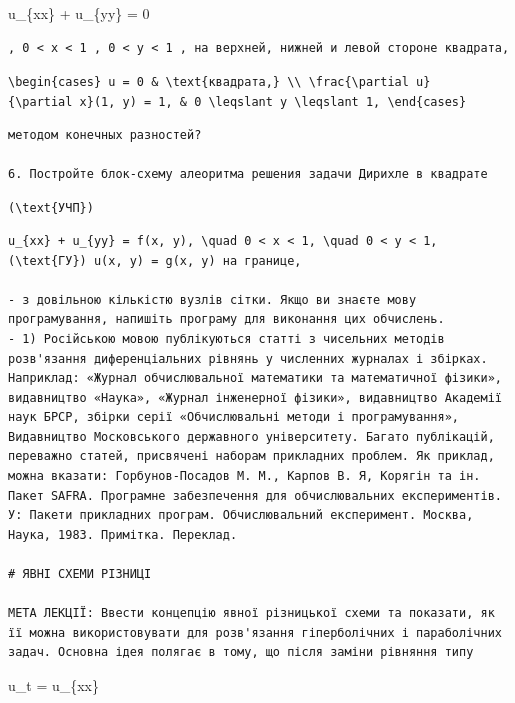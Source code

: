 \documentclass[
  ukrainian,
]{article}
\begin{document}
u\_\{xx\} + u\_\{yy\} = 0

\begin{verbatim}
, 0 < x < 1 , 0 < y < 1 , на верхней, нижней и левой стороне квадрата,
\end{verbatim}

\texttt{\textbackslash{}begin\{cases\}\ u\ =\ 0\ \&\ \textbackslash{}text\{квадрата,\}\ \textbackslash{}\textbackslash{}\ \textbackslash{}frac\{\textbackslash{}partial\ u\}\{\textbackslash{}partial\ x\}(1,\ y)\ =\ 1,\ \&\ 0\ \textbackslash{}leqslant\ y\ \textbackslash{}leqslant\ 1,\ \textbackslash{}end\{cases\}}

\begin{verbatim}
методом конечных разностей?

6. Постройте блок-схему алеоритма решения задачи Дирихле в квадрате
\end{verbatim}

\texttt{(\textbackslash{}text\{УЧП\})}

\begin{verbatim}
u_{xx} + u_{yy} = f(x, y), \quad 0 < x < 1, \quad 0 < y < 1, (\text{ГУ}) u(x, y) = g(x, y) на границе,

- з довільною кількістю вузлів сітки. Якщо ви знаєте мову програмування, напишіть програму для виконання цих обчислень.
- 1) Російською мовою публікуються статті з чисельних методів розв'язання диференціальних рівнянь у численних журналах і збірках. Наприклад: «Журнал обчислювальної математики та математичної фізики», видавництво «Наука», «Журнал інженерної фізики», видавництво Академії наук БРСР, збірки серії «Обчислювальні методи і програмування», Видавництво Московського державного університету. Багато публікацій, переважно статей, присвячені наборам прикладних проблем. Як приклад, можна вказати: Горбунов-Посадов М. М., Карпов В. Я, Корягін та ін. Пакет SAFRA. Програмне забезпечення для обчислювальних експериментів. У: Пакети прикладних програм. Обчислювальний експеримент. Москва, Наука, 1983. Примітка. Переклад.

# ЯВНІ СХЕМИ РІЗНИЦІ

МЕТА ЛЕКЦІЇ: Ввести концепцію явної різницької схеми та показати, як її можна використовувати для розв'язання гіперболічних і параболічних задач. Основна ідея полягає в тому, що після заміни рівняння типу
\end{verbatim}

u\_t = u\_\{xx\}
\end{document}
